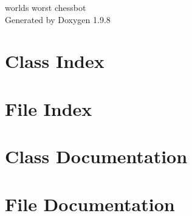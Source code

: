 \documentclass[twoside]{book}
\newcommand{\+}{\discretionary{\mbox{\scriptsize$\hookleftarrow$}}{}{}}
\newcommand{\clearemptydoublepage}{%
    \newpage{\pagestyle{empty}\cleardoublepage}%
  }
\begin{document}
  \raggedbottom
    \hypersetup{pageanchor=false,
                bookmarksnumbered=true,
                pdfencoding=unicode
               }
  \begin{titlepage}
  \vspace*{7cm}
  \begin{center}%
  {\Large world\textquotesingle{}s worst chessbot}\\
  \vspace*{1cm}
  {\large Generated by Doxygen 1.9.8}\\
  \end{center}
  \end{titlepage}
  \clearemptydoublepage
  \tableofcontents
  \clearemptydoublepage
  \hypersetup{pageanchor=true}
\chapter{Class Index}

\chapter{File Index}

\chapter{Class Documentation}



\chapter{File Documentation}




  \backmatter
  \newpage
  \clearemptydoublepage
  \printindex
\end{document}
